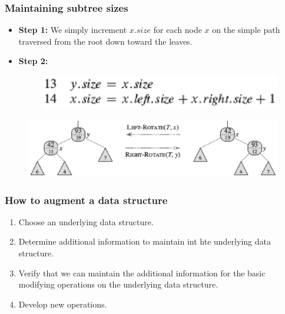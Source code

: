 \documentclass{beamer}
\begin{document}
\begin{frame}
 \frametitle{Maintaining subtree sizes}
 \begin{itemize}
  \item \textbf{Step 1:} We simply increment $x.size$ for each node $x$ on the simple path traversed from the root down toward
  the leaves.
  \item \textbf{Step 2:}
   \begin{figure}
    \includegraphics[scale=0.6]{4.eps}
   \end{figure}
 \end{itemize}
\end{frame}

\begin{frame}
 \begin{figure}
  \includegraphics[scale=0.6]{5.eps}
 \end{figure}
\end{frame}

\begin{frame}
 \frametitle{How to augment a data structure}
 \begin{enumerate}
  \item Choose an underlying data structure.
  \item Determine additional information to maintain int hte underlying data structure.
  \item Verify that we can maintain the additional information for the basic modifying operations on the
  underlying data structure.
  \item Develop new operations.
 \end{enumerate}

\end{frame}
\end{document}
